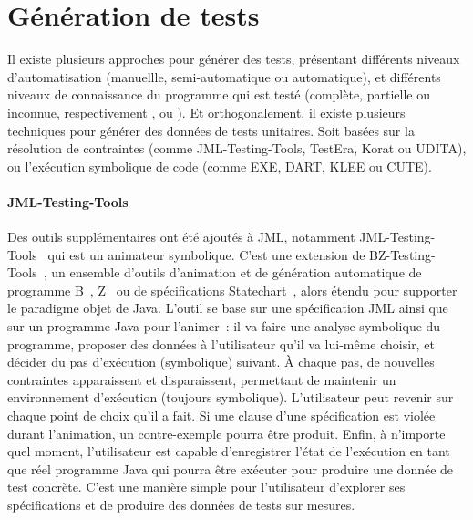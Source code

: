 \section{Génération de tests}
\label{section:sota:test_generation}

Il existe plusieurs approches pour générer des tests, présentant différents
niveaux d'automatisation (manuellle, semi-automatique ou automatique), et
différents niveaux de connaissance du programme qui est testé (complète,
partielle ou inconnue, respectivement ,
 ou ). Et orthogonalement, il existe
plusieurs techniques pour générer des données de tests unitaires. Soit basées
sur la résolution de contraintes (comme JML-Testing-Tools, TestEra, Korat ou
UDITA), ou l'exécution symbolique de code (comme EXE, DART, KLEE ou CUTE).

\paragraph{JML-Testing-Tools} Des outils supplémentaires ont été ajoutés à JML,
notamment JML-Testing-Tools~ qui est un animateur
symbolique. C'est une extension de BZ-Testing-Tools~, un
ensemble d'outils d'animation et de génération automatique de programme
B~, Z~ ou de spécifications
Statechart~, alors étendu pour supporter le paradigme objet de
Java. L'outil se base sur une spécification JML ainsi que sur un programme Java
pour l'animer~: il va faire une analyse symbolique du programme, proposer des
données à l'utilisateur qu'il va lui-même choisir, et décider du pas d'exécution
(symbolique) suivant. À chaque pas, de nouvelles contraintes apparaissent et
disparaissent, permettant de maintenir un environnement d'exécution (toujours
symbolique). L'utilisateur peut revenir sur chaque point de choix qu'il a fait.
Si une clause d'une spécification est violée durant l'animation, un
contre-exemple pourra être produit. Enfin, à n'importe quel moment,
l'utilisateur est capable d'enregistrer l'état de l'exécution en tant que réel
programme Java qui pourra être exécuter pour produire une donnée de test
concrète. C'est une manière simple pour l'utilisateur d'explorer ses
spécifications et de produire des données de tests sur mesures.

